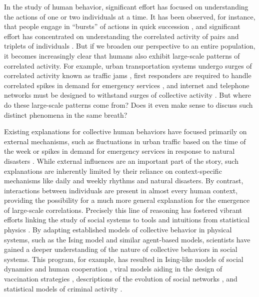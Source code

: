 \documentclass[aps,reprint,superscriptaddress,amsmath,amssymb,longbibliography]{revtex4-1}
\begin{document}
In the study of human behavior, significant effort has focused on understanding the actions of one or two individuals at a time. It has been observed, for instance, that people engage in ``bursts'' of actions in quick succession \cite{Barabasi-01,Vazquez-01,Rybski-01}, and significant effort has concentrated on understanding the correlated activity of pairs and triplets of individuals \cite{Eckmann-01,Rybski-01}. But if we broaden our perspective to an entire population, it becomes increasingly clear that humans also exhibit large-scale patterns of correlated activity. For example, urban transportation systems undergo surges of correlated activity known as traffic jams \cite{Peng-01}, first responders are required to handle correlated spikes in demand for emergency services \cite{Bagrow-01}, and internet and telephone networks must be designed to withstand surges of collective activity \cite{Crane-01,Candia-01}. But where do these large-scale patterns come from? Does it even make sense to discuss such distinct phenomena in the same breath?

Existing explanations for collective human behaviors have focused primarily on external mechanisms, such as fluctuations in urban traffic based on the time of the week \cite{Peng-01} or spikes in demand for emergency services in response to natural disasters \cite{Bagrow-01}. While external influences are an important part of the story, such explanations are inherently limited by their reliance on context-specific mechanisms like daily and weekly rhythms and natural disasters. By contrast, 
interactions between individuals are present in almost every human context, providing the possibility for a much more general explanation for the emergence of large-scale correlations. Precisely this line of reasoning has fostered vibrant efforts linking the study of social systems to tools and intuitions from statistical physics \cite{Castellano-01}. By adapting established models of collective behavior in physical systems, such as the Ising model and similar agent-based models, scientists have gained a deeper understanding of the nature of collective behaviors in social systems. This program, for example, has resulted in Ising-like models of social dynamics and human cooperation \cite{Perc-01,Galam-02,Galam-04}, viral models aiding in the design of vaccination strategies \cite{Wang-01}, descriptions of the evolution of social networks \cite{Barabasi-02}, and statistical models of criminal activity \cite{DOrsogna-01,Helbing-01}.
\end{document}
